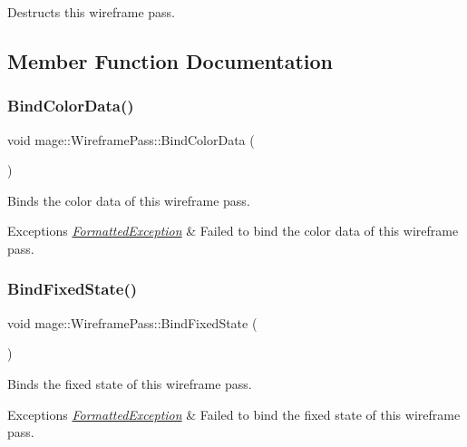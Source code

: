 Destructs this wireframe pass. 

\subsection{Member Function Documentation}
\hypertarget{classmage_1_1_wireframe_pass_a574897c1274585057e8d44070409b7e3}{}\label{classmage_1_1_wireframe_pass_a574897c1274585057e8d44070409b7e3} 
\subsubsection{\texorpdfstring{Bind\+Color\+Data()}{BindColorData()}}
{\footnotesize\ttfamily void mage\+::\+Wireframe\+Pass\+::\+Bind\+Color\+Data (\begin{DoxyParamCaption}{ }\end{DoxyParamCaption})\hspace{0.3cm}{\ttfamily [private]}}

Binds the color data of this wireframe pass.


\begin{DoxyExceptions}{Exceptions}
{\em \hyperlink{structmage_1_1_formatted_exception}{Formatted\+Exception}} & Failed to bind the color data of this wireframe pass. \\
\hline
\end{DoxyExceptions}
\hypertarget{classmage_1_1_wireframe_pass_abf99690ae099ed0ba0ca35c5d87ac0ef}{}\label{classmage_1_1_wireframe_pass_abf99690ae099ed0ba0ca35c5d87ac0ef} 
\subsubsection{\texorpdfstring{Bind\+Fixed\+State()}{BindFixedState()}}
{\footnotesize\ttfamily void mage\+::\+Wireframe\+Pass\+::\+Bind\+Fixed\+State (\begin{DoxyParamCaption}{ }\end{DoxyParamCaption})}

Binds the fixed state of this wireframe pass.


\begin{DoxyExceptions}{Exceptions}
{\em \hyperlink{structmage_1_1_formatted_exception}{Formatted\+Exception}} & Failed to bind the fixed state of this wireframe pass. \\
\hline
\end{DoxyExceptions}
\hypertarget{classmage_1_1_wireframe_pass_a6e316eaabf3afb71162490c1f3c244f3}{}\label{classmage_1_1_wireframe_pass_a6e316eaabf3afb71162490c1f3c244f3} 

